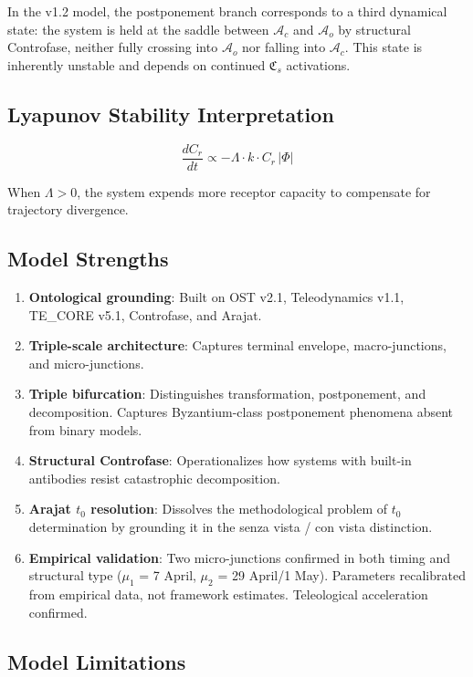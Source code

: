 \documentclass[12pt,a4paper]{article}
\newcommand{\reag}{C_r}
\newcommand{\CFs}{\mathfrak{C}_s}        %
\newcommand{\Ac}{\mathcal{A}_c}          %
\newcommand{\Ao}{\mathcal{A}_o}          %
\begin{document}
In the v1.2 model, the postponement branch corresponds to a third dynamical state: the system is held at the saddle between $\Ac$ and $\Ao$ by structural Controfase, neither fully crossing into $\Ao$ nor falling into $\Ac$. This state is inherently unstable and depends on continued $\CFs$ activations.

\subsection{Lyapunov Stability Interpretation}

\begin{equation}
\frac{d\reag}{dt} \propto -\Lambda \cdot k \cdot \reag\,|\Phi|
\end{equation}

When $\Lambda > 0$, the system expends more receptor capacity to compensate for trajectory divergence.

\subsection{Model Strengths}

\begin{enumerate}[label=(\roman*)]
    \item \textbf{Ontological grounding}: Built on OST v2.1, Teleodynamics v1.1, TE\_CORE v5.1, Controfase, and Arajat.
    \item \textbf{Triple-scale architecture}: Captures terminal envelope, macro-junctions, and micro-junctions.
    \item \textbf{Triple bifurcation}: Distinguishes transformation, postponement, and decomposition. Captures Byzantium-class postponement phenomena absent from binary models.
    \item \textbf{Structural Controfase}: Operationalizes how systems with built-in antibodies resist catastrophic decomposition.
    \item \textbf{Arajat $t_0$ resolution}: Dissolves the methodological problem of $t_0$ determination by grounding it in the senza vista / con vista distinction.
    \item \textbf{Empirical validation}: Two micro-junctions confirmed in both timing and structural type ($\mu_1$ = 7 April, $\mu_2$ = 29 April/1 May). Parameters recalibrated from empirical data, not framework estimates. Teleological acceleration confirmed.
\end{enumerate}

\subsection{Model Limitations}
\end{document}
